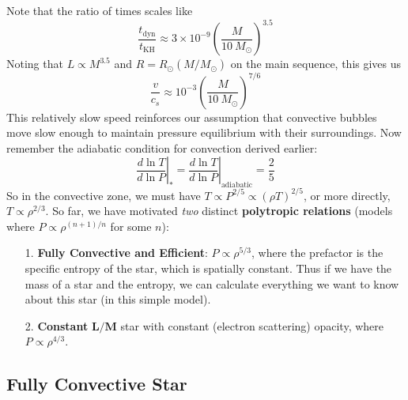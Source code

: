 \documentclass[10pt]{article}
\numberwithin{equation}{section}
\newcommand{\n}{\noindent}
\begin{document}
  \n Note that the ratio of times scales like
  \begin{equation}
    \label{eq:49}
    \frac{t_{\mathrm{dyn}}}{t_{\mathrm{KH}}}\approx 3\times
    10^{-9}\left(\frac{M}{10\ M_\odot}\right)^{3.5}
  \end{equation}
  Noting that $L\propto M^{3.5}$ and $R=R_\odot(M/M_\odot)$ on the
  main sequence, this gives us
  \begin{equation}
    \label{eq:50}
    \frac{v}{c_s}\approx 10^{-3}\left(\frac{M}{10\ M_\odot}\right)^{7/6}
  \end{equation}
  This relatively slow speed reinforces our assumption that convective
  bubbles move slow enough to maintain pressure equilibrium with their
  surroundings. Now remember the adiabatic condition for convection
  derived earlier:
  \begin{equation}
    \label{eq:51}
    \left.\frac{d\ln T}{d\ln P}\right|_*=\left.\frac{d\ln T}{d\ln P}\right|_{\mathrm{adiabatic}}=\frac{2}{5}
  \end{equation}
  So in the convective zone, we must have $T\propto P^{2/5}\propto
  (\rho T)^{2/5}$, or more directly, $T\propto \rho^{2/3}$. So far, we
  have motivated \emph{two} distinct \textbf{polytropic relations}
  (models where $P\propto \rho^{(n+1)/n}$ for some $n$):
  \begin{enumerate}
  \item[1.] \textbf{Fully Convective and Efficient}: $P\propto \rho^{5/3}$,
    where the prefactor is the specific entropy of the star, which is
    spatially constant. Thus if we have the mass of a star and the
    entropy, we can calculate everything we want to know about this
    star (in this simple model).
  \item[2.] \textbf{Constant} $\bm{L/M}$ star with constant (electron scattering)
    opacity, where $P\propto \rho^{4/3}$.
  \end{enumerate}

  \subsection{Fully Convective Star}
  \label{sec:fully-conv-star}
\end{document}

